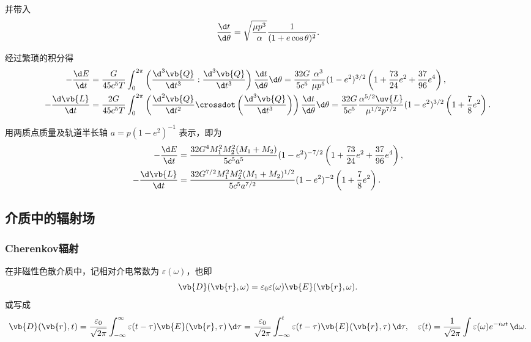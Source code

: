 \begin{notes}
	并带入
	\begin{equation*}
		\frac{\d t}{\d \theta} = \sqrt{\frac{\mu p^3}{\alpha}} \frac{1}{(1 + e\cos\theta)^2}.
	\end{equation*}

	经过繁琐的积分得
	\begin{align*}
		-\frac{\d E}{\d t} &= \frac{G}{45 c^5 T} \int_{0}^{2\pi} \left( \frac{\d^3\vb{Q}}{\d t^3} : \frac{\d^3\vb{Q}}{\d t^3} \right) \frac{\d t}{\d \theta} \d \theta
		= \frac{32 G}{5 c^5} \frac{\alpha^3}{\mu p^5} (1 - e^2)^{3/2} \left( 1 + \frac{73}{24}e^2 + \frac{37}{96}e^4 \right), \\
		-\frac{\d \vb{L}}{\d t} &= \frac{2 G}{45 c^5 T} \int_{0}^{2\pi} \left( \frac{\d^2\vb{Q}}{\d t^2} \crossdot \left( \frac{\d^3\vb{Q}}{\d t^3} \right) \right) \frac{\d t}{\d \theta} \d \theta
		= \frac{32 G}{5 c^5} \frac{\alpha^{5/2} \uv{L}}{\mu^{1/2} p^{7/2}} (1 - e^2)^{3/2} \left( 1 + \frac{7}{8}e^2 \right).
	\end{align*}

	用两质点质量及轨道半长轴 \(a = p(1-e^2)^{-1}\) 表示，即为
	\begin{align*}
		-\frac{\d E}{\d t} &= \frac{32 G^4 M_1^2 M_2^2 (M_1 + M_2)}{5 c^5 a^5} (1 - e^2)^{-7/2} \left( 1 + \frac{73}{24}e^2 + \frac{37}{96}e^4 \right), \\
		-\frac{\d \vb{L}}{\d t} &= \frac{32 G^{7/2} M_1^2 M_2^2 (M_1 + M_2)^{1/2}}{5 c^5 a^{7/2}} (1 - e^2)^{-2} \left( 1 + \frac{7}{8}e^2 \right).
	\end{align*}

\end{notes}

\subsection{介质中的辐射场}
\subsubsection{Cherenkov辐射}
在非磁性色散介质中，记相对介电常数为 \(\varepsilon(\omega)\)，也即
\begin{equation*}
	\vb{D}(\vb{r},\omega) = \varepsilon_{0} \varepsilon(\omega) \vb{E}(\vb{r},\omega).
\end{equation*}
或写成
\begin{equation*}
	\vb{D}(\vb{r},t) = \frac{\varepsilon_{0}}{\sqrt{2\pi}} \int_{-\infty}^{\infty} \varepsilon(t-\tau) \vb{E}(\vb{r},\tau) \, \d \tau = \frac{\varepsilon_{0}}{\sqrt{2\pi}} \int_{-\infty}^{t} \varepsilon(t-\tau) \vb{E}(\vb{r},\tau) \, \d \tau, \quad \varepsilon(t) = \frac{1}{\sqrt{2\pi}} \int \varepsilon(\omega) e^{-i\omega t} \, \d \omega.
\end{equation*}

